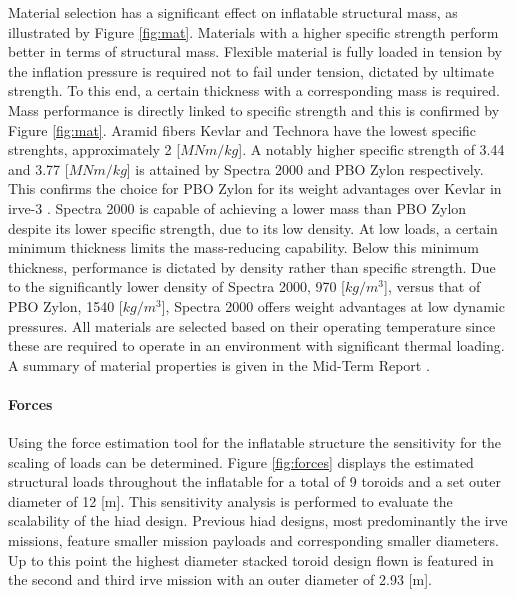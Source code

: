 Material selection has a significant effect on inflatable structural mass, as illustrated by Figure \ref{fig:mat}. Materials with a higher specific strength perform better in terms of structural mass. Flexible material is fully loaded in tension by the inflation pressure is required not to fail under tension, dictated by ultimate strength. To this end, a certain thickness with a corresponding mass is required. Mass performance is directly linked to specific strength and this is confirmed by Figure \ref{fig:mat}. Aramid fibers Kevlar and Technora have the lowest specific strenghts, approximately 2 [$MNm/kg$]. A notably higher specific strength of 3.44 and 3.77 [$MNm/kg$] is attained by Spectra 2000 and PBO Zylon respectively. This confirms the choice for PBO Zylon for its weight advantages over Kevlar in \gls{irve}-3 \cite{Dillman2012a}. Spectra 2000 is capable of achieving a lower mass than PBO Zylon despite its lower specific strength, due to its low density. At low loads, a certain minimum thickness limits the mass-reducing capability. Below this minimum thickness, performance is dictated by density rather than specific strength. Due to the significantly lower density of Spectra 2000, 970 [$kg/m^{3}$], versus that of PBO Zylon, 1540 [$kg/m^{3}$], Spectra 2000 offers weight advantages at low dynamic pressures. All materials are selected based on their operating temperature since these are required to operate in an environment with significant thermal loading. A summary of material properties is given in the Mid-Term Report \cite[p.64]{Balasooriyan2015b}.


\paragraph{Forces}

Using the force estimation tool for the inflatable structure the sensitivity for the scaling of loads can be determined. Figure \ref{fig:forces} displays the estimated structural loads throughout the inflatable for a total of 9 toroids and a set outer diameter of 12 [m]. This sensitivity analysis is performed to evaluate the scalability of the \gls{hiad} design. Previous \gls{hiad} designs, most predominantly the \gls{irve} missions, feature smaller mission payloads and corresponding smaller diameters. Up to this point the highest diameter stacked toroid design flown is featured in the second and third \gls{irve} mission with an outer diameter of 2.93 [m]. 


